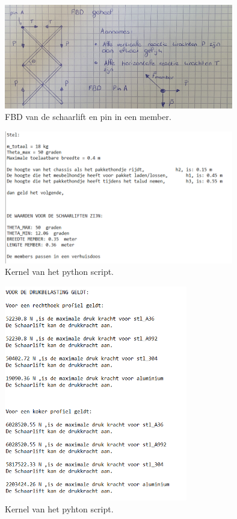 \begin{figure}[H]
    \includegraphics[width = 100mm]{04_conceptdimensionering/member_FBD.jpg}
    \caption{FBD van de schaarlift en pin in een member.}
    \label{fig: FBD_member}
\end{figure}
\vspace{\baselineskip}

\begin{figure}[H]
    \includegraphics[width = 100mm]{04_conceptdimensionering/Schaarlift_kernel_1.PNG}
    \caption{Kernel van het python script.}
    \label{fig: Kernel_schaarlift_1}
\end{figure}

\begin{figure}[H]
    \includegraphics[width = 80mm]{04_conceptdimensionering/Schaar.PNG}
    \caption{Kernel van het pyhton script.}
    \label{fig: Kernel_schaarlift_2}
\end{figure}
\vspace{\baselineskip}

